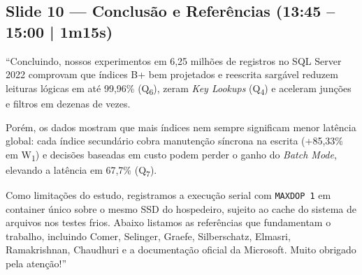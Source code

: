 \documentclass[10pt,a4paper]{article}
\begin{document}
\subsection{Slide 10 — Conclusão e Referências (13:45 – 15:00 | 1m15s)}
\begin{fala}
``Concluindo, nossos experimentos em 6,25 milhões de registros no SQL Server 2022 comprovam que índices B+ bem projetados e reescrita sargável reduzem leituras lógicas em até 99,96\% (Q\textsubscript{6}), zeram \textit{Key Lookups} (Q\textsubscript{4}) e aceleram junções e filtros em dezenas de vezes.

Porém, os dados mostram que mais índices nem sempre significam menor latência global: cada índice secundário cobra manutenção síncrona na escrita (+85,33\% em W\textsubscript{1}) e decisões baseadas em custo podem perder o ganho do \textit{Batch Mode}, elevando a latência em 67,7\% (Q\textsubscript{7}).

Como limitações do estudo, registramos a execução serial com \texttt{MAXDOP 1} em container único sobre o mesmo SSD do hospedeiro, sujeito ao cache do sistema de arquivos nos testes frios. Abaixo listamos as referências que fundamentam o trabalho, incluindo Comer, Selinger, Graefe, Silberschatz, Elmasri, Ramakrishnan, Chaudhuri e a documentação oficial da Microsoft. Muito obrigado pela atenção!''
\end{fala}
\end{document}
